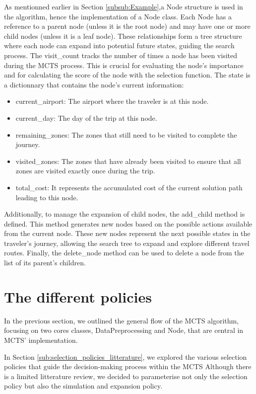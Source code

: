 As mentionned earlier in Section \ref{subsub:Example},a Node structure is used in the algorithm, hence the implementation of a Node class.
Each Node has a reference to a parent node (unless it is the root node) and may have one or more child nodes (unless it is a leaf node). These relationships form a tree structure where each node can expand into potential future states, guiding the search process.
The visit\_count tracks the number of times a node has been visited during the MCTS process. This is crucial for evaluating the node’s importance and for calculating the score of the node with the selection function.
The state is a dictionnary that contains the node's current information:
\begin{itemize}
    \item current\_airport: The airport where the traveler is  at this node.
    \item current\_day: The day of the trip at this node.
    \item remaining\_zones: The zones that still need to be visited to complete the journey.
    \item visited\_zones: The zones that have already been visited to ensure that all zones are visited exactly once during the trip.
    \item total\_cost: It represents the accumulated cost of the current solution path leading to this node.
\end{itemize}

Additionally, to manage the expansion of child nodes, the add\_child method is defined.
This method generates new nodes based on the possible actions available from the current node. These new nodes represent the next possible states in the traveler’s journey, allowing the search tree to expand and explore different travel routes.
Finally, the delete\_node method can be used to delete a node from the list of its parent's children.


\section{The different policies}
In the previous section, we outlined the general flow of the MCTS algorithm, focusing on two cores classes, DataPreprocessing and Node, that are central in MCTS' implementation.

In Section \ref{sub:selection_policies_litterature}, we explored the various selection policies that guide the decision-making process within the MCTS
Although there is a limited litterature review, we decided to parameterise not only the selection policy but also the simulation and expansion policy.

